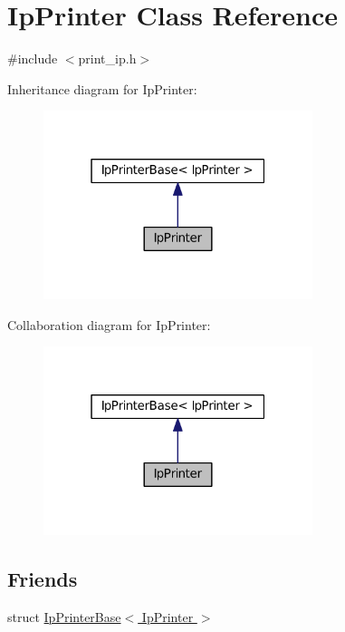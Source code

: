 \hypertarget{class_ip_printer}{}\section{Ip\+Printer Class Reference}
\label{class_ip_printer}


{\ttfamily \#include $<$print\+\_\+ip.\+h$>$}



Inheritance diagram for Ip\+Printer\+:
\nopagebreak
\begin{figure}[H]
\begin{center}
\leavevmode
\includegraphics[width=223pt]{class_ip_printer__inherit__graph}
\end{center}
\end{figure}


Collaboration diagram for Ip\+Printer\+:
\nopagebreak
\begin{figure}[H]
\begin{center}
\leavevmode
\includegraphics[width=223pt]{class_ip_printer__coll__graph}
\end{center}
\end{figure}
\subsection*{Friends}
\begin{DoxyCompactItemize}
\item 
struct \hyperlink{class_ip_printer_a75f196212357865a0588d194fb42d17c}{Ip\+Printer\+Base$<$ Ip\+Printer $>$}
\end{DoxyCompactItemize}
